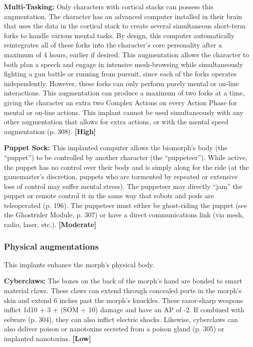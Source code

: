 \textbf{Multi-Tasking:} Only characters with cortical stacks can possess this augmentation. The character has an advanced computer installed in their brain that uses the data in the cortical stack to create several simultaneous short-term forks to handle various mental tasks. By design, this computer automatically reintegrates all of these forks into the character’s core personality after a maximum of 4 hours, earlier if desired. This augmentation allows the character to both plan a speech and engage in intensive mesh-browsing while simultaneously fighting a gun battle or running from pursuit, since each of the forks operates independently. However, these forks can only perform purely mental or on-line interactions. This augmentation can produce a maximum of two forks at a time, giving the character an extra two Complex Actions on every Action Phase for mental or on-line actions. This implant cannot be used simultaneously with any other augmentation that allows for extra actions, or with the mental speed augmentation (p. 308). \textbf{[High]}

\textbf{Puppet Sock:} This implanted computer allows the biomorph’s body (the ``puppet'') to be controlled by another character (the ``puppeteer''). While active, the puppet has no control over their body and is simply along for the ride (at the gamemaster’s discretion, puppets who are tormented by repeated or extensive loss of control may suffer mental stress). The puppeteer may directly ``jam'' the puppet or remote control it in the same way that robots and pods are teleoperated (p. 196). The puppeteer must either be ghost-riding the puppet (see the Ghostrider Module, p. 307) or have a direct communications link (via mesh, radio, laser, etc.). \textbf{[Moderate]}

\subsubsection{Physical augmentations}

This implants enhance the morph’s physical body.

\textbf{Cyberclaws:} The bones on the back of the morph’s hand are bonded to smart material claws. These claws can extend through concealed ports in the morph’s skin and extend 6 inches past the morph’s knuckles. These razor-sharp weapons inflict 1d10 + 3 + (SOM $\div$ 10) damage and have an AP of -2. If combined with eelware (p. 304), they can also inflict electric shocks. Likewise, cyberclaws can also deliver poison or nanotoxins secreted from a poison gland (p. 305) or implanted nanotoxins. \textbf{[Low]}

